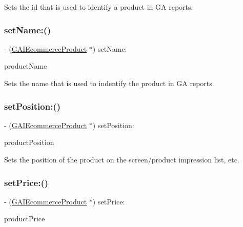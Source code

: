 Sets the id that is used to identify a product in GA reports. \mbox{\label{interface_g_a_i_ecommerce_product_a0a5f048029cdcd09c2014a10bee1cb65}} 
\subsubsection{\texorpdfstring{set\+Name\+:()}{setName:()}}
{\footnotesize\ttfamily -\/ (\hyperlink{interface_g_a_i_ecommerce_product}{G\+A\+I\+Ecommerce\+Product} $\ast$) set\+Name\+: \begin{DoxyParamCaption}\item[{(N\+S\+String $\ast$)}]{product\+Name }\end{DoxyParamCaption}}

Sets the name that is used to indentify the product in GA reports. \mbox{\label{interface_g_a_i_ecommerce_product_a1fc008512a08f92e9b632dac80f860b2}} 
\subsubsection{\texorpdfstring{set\+Position\+:()}{setPosition:()}}
{\footnotesize\ttfamily -\/ (\hyperlink{interface_g_a_i_ecommerce_product}{G\+A\+I\+Ecommerce\+Product} $\ast$) set\+Position\+: \begin{DoxyParamCaption}\item[{(N\+S\+Number $\ast$)}]{product\+Position }\end{DoxyParamCaption}}

Sets the position of the product on the screen/product impression list, etc. \mbox{\label{interface_g_a_i_ecommerce_product_af6b2de0cb8a61ec76f2fc60cf44181f3}} 
\subsubsection{\texorpdfstring{set\+Price\+:()}{setPrice:()}}
{\footnotesize\ttfamily -\/ (\hyperlink{interface_g_a_i_ecommerce_product}{G\+A\+I\+Ecommerce\+Product} $\ast$) set\+Price\+: \begin{DoxyParamCaption}\item[{(N\+S\+Number $\ast$)}]{product\+Price }\end{DoxyParamCaption}}

